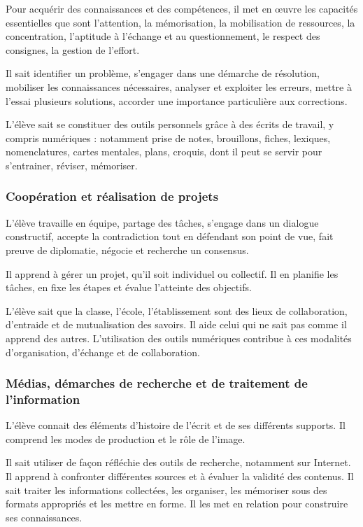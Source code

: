 Pour acquérir des connaissances et des compétences, il met en œuvre les capacités essentielles que sont l’attention, la mémorisation, la mobilisation de ressources, la concentration, l’aptitude à l’échange et au questionnement, le respect des consignes, la gestion de l’effort.

Il sait identifier un problème, s’engager dans une démarche de résolution, mobiliser les connaissances nécessaires, analyser et exploiter les erreurs, mettre à l’essai plusieurs solutions, accorder une importance particulière aux corrections.

L’élève sait se constituer des outils personnels grâce à des écrits de travail, y compris numériques : notamment prise de notes, brouillons, fiches, lexiques, nomenclatures, cartes mentales, plans, croquis, dont il peut se servir pour s’entrainer, réviser, mémoriser.

\subsubsection{Coopération et réalisation de projets}
L’élève travaille en équipe, partage des tâches, s’engage dans un dialogue constructif, accepte la contradiction tout en défendant son point de vue, fait preuve de diplomatie, négocie et recherche un consensus.

Il apprend à gérer un projet, qu’il soit individuel ou collectif. Il en planifie les tâches, en fixe les étapes et évalue l’atteinte des objectifs.

L’élève sait que la classe, l’école, l’établissement sont des lieux de collaboration, d’entraide et de mutualisation des savoirs. Il aide celui qui ne sait pas comme il apprend des autres. L’utilisation des outils numériques contribue à ces modalités d’organisation, d’échange et de collaboration.

\subsubsection{Médias, démarches de recherche et de traitement de l’information}
L’élève connait des éléments d’histoire de l’écrit et de ses différents supports. Il comprend les modes de production et le rôle de l’image.

Il sait utiliser de façon réfléchie des outils de recherche, notamment sur Internet. Il apprend à confronter différentes sources et à évaluer la validité des contenus. Il sait traiter les informations collectées, les organiser, les mémoriser sous des formats appropriés et les mettre en forme. Il les met en relation pour construire ses connaissances.

